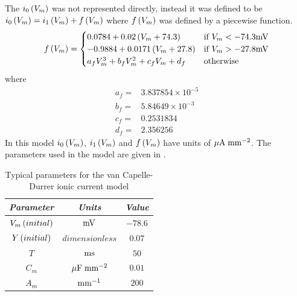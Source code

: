 The $ i_0\left( V_m \right) $ was not represented directly, instead it was defined to
be $ i_0\left( V_m \right) = i_1\left( V_m \right) + f\left( V_m \right) $ where $ f\left( V_m \right) $ was
defined by a piecewise function.
\begin{gather}
  \label{eqn: three_cases_of_f_VCD}
  \begin{aligned}
   f\left( V_m \right) =
  \begin{cases}
    0.0784+0.02\left( V_m+74.3 \right) 
      & \text{if $V_m < -74.3\mathrm{mV}$} \\
    -0.9884+0.0171\left( V_m+27.8 \right) 
      & \text{if $V_m > -27.8\mathrm{mV}$} \\
    a_fV_m^3+b_fV_m^2+c_fV_m+d_f 
      & \text{otherwise}
  \end{cases}
  \end{aligned}
\end{gather}
where
\begin{align*}
  a_f=& 3.837854\times 10^{-5}\\
  b_f=& 5.84649\times 10^{-3}\\
  c_f=& 0.2531834\\
  d_f=& 2.356256
\end{align*}
In this model $ i_0\left( V_m \right) $, $ i_1\left( V_m \right) $ and $ f\left( V_m \right) $ have
units of $\mathrm{\mu A}\thickspace\mathrm{mm}^{-2}$. The parameters used in the model are
given in .
\begin{table}[hbtp] \centering
  \begin{tabular}{|c|c|c|}
    \hline
    \emph{Parameter} & \emph{Units} & \emph{Value} \\ 
    \hline
    \hline 
    $V_m\left( initial \right)$ & $\mathrm{mV}$ & $-78.6$ \\
    $Y\left( initial \right)$ & $dimensionless$ & $0.07$ \\
    $T$ & $\mathrm{ms}$ & $50$ \\
    $C_m$ & $\mathrm{\mu F}\thickspace\mathrm{mm}^{-2}$ & $0.01$ \\
    $A_m$ & $\mathrm{mm}^{-1}$ & $200$ \\
    \hline
  \end{tabular}
  \caption[Typical parameters for the van Capelle-Durrer ionic current model]{Typical
    parameters for the van Capelle-Durrer ionic current model}
  \label{tab:VCD_Model_Params}
\end{table}

